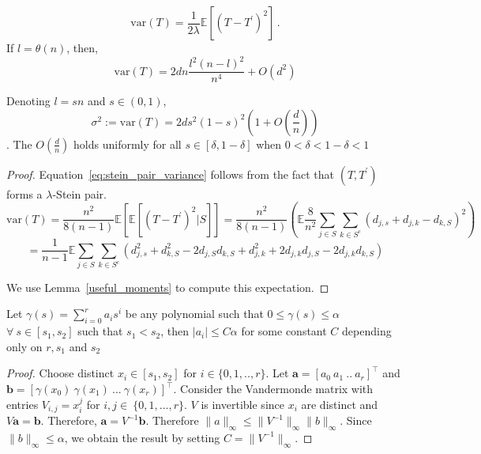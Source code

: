 \documentclass[final,12pt]{colt2018}
\begin{document}
\begin{lemma}

\begin{equation}
\mathrm{var}(T) = \frac{1}{2\lambda}\mathbb{E}\left[(T-T^{\prime})^2\right] \,.
\label{eq:stein_pair_variance}
\end{equation}
If $l = \theta(n)$, then, $$\mathrm{var}(T) = 2dn\frac{l^2(n-l)^2}{n^4} + O(d^2)$$

Denoting $l = sn$ and $s \in (0,1)$,  $$\sigma^2 := \mathrm{var}(T) = 2ds^2(1-s)^2( 1 + O(\frac{d}{n}))$$. The $O(\frac{d}{n})$ holds uniformly for all $s \in [\delta,1-\delta]$ when $0<\delta<1-\delta<1$ 
\label{std_dev}
\end{lemma}

\begin{proof}
Equation~\ref{eq:stein_pair_variance} follows from the fact that $(T,T^{\prime})$ forms a $\lambda$-Stein pair.
$$
\mathrm{var}(T) = \frac{n^2}{8(n-1)}\mathbb{E}\left[\mathbb{E}\left[(T-T^{\prime})^2|S\right] \right]= \frac{n^2}{8(n-1)}\left(\mathbb{E}\frac{8}{n^2}\sum_{j\in S}\sum_{k \in S^c} (d_{j,s}+d_{j,k}-d_{k,S})^2\right) $$
$$ = \frac{1}{n-1}\mathbb{E} \sum_{j\in S}\sum_{k \in S^c}(d_{j,s}^2 + d_{k,S}^2-2d_{j,S}d_{k,S} + d_{j,k}^2 + 2d_{j,k}d_{j,S} - 2d_{j,k}d_{k,S})$$

We use Lemma~\ref{useful_moments} to compute this expectation.
\end{proof}




\begin{lemma}
Let $\gamma(s) = \sum_{i=0}^{r}a_i s^i$ be any polynomial such that $ 0 \leq \gamma(s) \leq \alpha $ $\forall \ s \in [s_1,s_2]$ such that $s_1 < s_2$, then $|a_i| \leq  C\alpha$ for some constant $C$ depending only on $r, s_1$ and $s_2$
\label{comparison_bound}
\end{lemma}
\begin{proof}
Choose distinct $x_i \in [s_1,s_2]$ for $i \in \{0,1,..,r\}$. Let $\bm{a} = \left[a_0\ a_1\ ..\ a_r\right]^{\intercal} $ and $\bm{b} = \left[\gamma(x_0)\ \gamma(x_1)\ ...\ \gamma(x_{r})\right]^{\intercal}$. Consider the Vandermonde matrix with entries $V_{i,j} = x_i^{j}$ for $i,j \in \ \{0,1,...,r\}$. $V$ is invertible since $x_i$ are distinct and $V\bm{a} = \bm{b}$. Therefore, $\bm{a} = V^{-1}\bm{b}$. Therefore $\|a\|_{\infty} \leq \|V^{-1}\|_{\infty}\|b\|_{\infty}$. Since $\|b\|_{\infty} \leq \alpha$, we obtain the result by setting $C =  \|V^{-1}\|_{\infty}$.
\end{proof}
\end{document}
